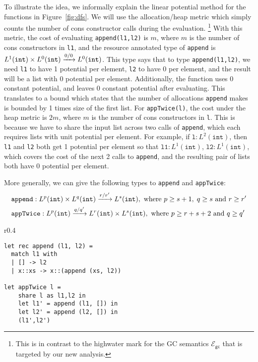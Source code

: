 \documentclass{easychair}
\newcommand{\ms}[1]{\ensuremath{\mathsf{#1}}}
\newcommand{\irl}[1]{\mathtt{#1}}
\newcommand{\gcSem}{\ensuremath{\mathcal{E}_{\ms{gc}}}}
\theoremstyle{definition}
\begin{document}
To illustrate the idea, we informally explain the linear potential method for the functions in Figure~\ref{fig:dfs}.
We will use the allocation/heap metric which simply counts the number of cons constructor calls during the evaluation.%
\footnote{This is in contrast to the highwater mark for the GC semantics \gcSem{} that is targeted by our new analysis.}
With this metric, the cost of evaluating \texttt{append(l1,l2)} is $m$, where $m$ is the number 
of cons constructors in \texttt{l1}, and the resource annotated type of \texttt{append} is 
$\prodtycst{L^1(\irl{int})}{L^0(\irl{int})} \xrightarrow{0/0} L^0(\irl{int})$.
This type says that to type \texttt{append(l1,l2)}, we need \texttt{l1} 
to have 1 potential per element, \texttt{l2} to have 0 per element, and the result 
will be a list with 0 potential per element.
Additionally, the function uses 0 constant potential, and 
leaves 0 constant potential after evaluating. This translates to a bound which states that 
the number of allocations \texttt{append} makes is bounded by 1 times size of the first list.
For \texttt{appTwice(l)}, the cost under the heap metric is $2m$, where $m$ is the number of cons 
constructors in \texttt{l}. This is because we have to share the input list across 
two calls of \texttt{append}, which each requires lists with unit potential per element.
For example, if $\texttt{l} : L^2(\irl{int})$, then \texttt{l1} and 
\texttt{l2} both get 1 potential per element so that $\texttt{l1} : L^1(\irl{int})$,
$\texttt{l2} : L^1(\irl{int})$, which covers the cost of the next 2 calls to \texttt{append}, 
and the resulting pair of lists both have 0 potential per element.

More generally, we can give the following types to \texttt{append} and \texttt{appTwice}:
\begin{align*}
	&\texttt{append} : \prodtycst{L^p(\irl{int})}{L^q(\irl{int})} \xrightarrow{r/r'} L^s(\irl{int}), \text{ 
	where } p \ge s + 1,\; q \ge s \text{ and } r \ge r' \\
	&\texttt{appTwice} : L^p(\irl{int}) \xrightarrow{q/q'} \prodtycst{L^r(\irl{int})}{L^s(\irl{int})},
	\text{ where } p \ge r + s + 2 \text{ and } q \ge q'
\end{align*}

\begin{wrapfigure}{r}{0.4\textwidth}
	\vspace{-15pt}
		\begin{center}
\begin{verbatim}
let rec append (l1, l2) =
  match l1 with
  | [] -> l2
  | x::xs -> x::(append (xs, l2))

let appTwice l = 
    share l as l1,l2 in
    let l1' = append (l1, []) in 
    let l2' = append (l2, []) in 
    (l1',l2')
\end{verbatim}
			\end{center}
				\vspace{-15pt}
			\caption{Functions \texttt{append} and \texttt{appTwice}}
		\vspace{-10pt}
\label{fig:dfs}
\end{wrapfigure}
\end{document}
